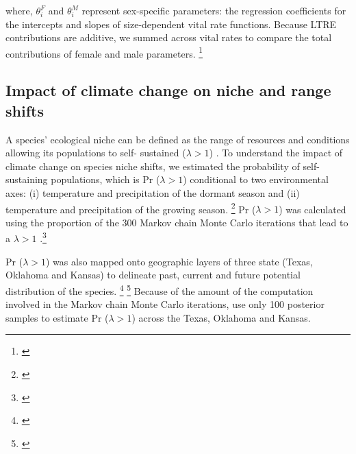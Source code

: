 \documentclass[12pt]{article}\usepackage[]{graphicx}\usepackage[dvipsnames]{xcolor}
\newcommand{\tom}[2]{{\color{red}{#1}}\footnote{\textit{\color{red}{#2}}}}
\begin{document}
\noindent where, $\theta^{F}_{i}$ and $\theta^{M}_{i}$ represent sex-specific parameters: the regression coefficients for the intercepts and slopes of size-dependent vital rate functions. 
Because LTRE contributions are additive, we summed across vital rates to compare the total contributions of female and male parameters. \tom{}{I don't really understand how this LTRE works because your climate variables interact. So this should not decompose as cleanly as the equation implies.}

\subsection*{Impact of climate change on niche and range shifts}
A species' ecological niche can be defined as the range of resources and conditions allowing its populations to self- sustained  ($\lambda > 1$) \citep{maguire1973niche,hutchinson1978introduction}.
To understand the impact of climate change on species niche shifts, we estimated the probability of self- sustaining populations, which is Pr ($\lambda > 1$) conditional to two environmental axes: (i) temperature and precipitation of the dormant season and (ii) temperature and precipitation of the growing season. \tom{}{As a general comment, I find it difficult to follow which analyses are explicitly spatial (i.e., mapping quantities as rasters) and which are not -- I think the methods can be sharpened around this.}
Pr ($\lambda > 1$) was calculated using the proportion of the 300 Markov chain Monte Carlo iterations that lead to a $\lambda > 1$ \citep{diez2014probabilistic}.\tom{}{I suggest you bring this up much earlier, in the Intro probably. I think you under-sell the value of this approach, particularly related to accounting for uncertainty. You also need to describe which types of uncertainty are accounted for here, i.e., process error and estimation error.}

Pr ($\lambda > 1$) was also mapped onto geographic layers of three state (Texas, Oklahoma and Kansas) to delineate past, current and future potential distribution of the species.
\tom{To do so, we estimated Pr ($\lambda > 1$) conditional to all climate covariates for each pixel ($\sim$340 km2) across the species range.}{I think you did this separately for past, present, and future, and for multiple futures? Needs to be explained.} 
\tom{Then we add the current occurrences record of the species (1990-2019) from Global Biodiversity Information Facility (GBIF) to validate the accuracy of our prediction}{If you actually intend this as model validation then it needs to be presented more thoroughly and analyzed more rigorously.}
Because of the amount of the computation involved in the Markov chain Monte Carlo iterations, use only 100 posterior samples to estimate Pr ($\lambda > 1$) across the Texas, Oklahoma and Kansas.
\end{document}
